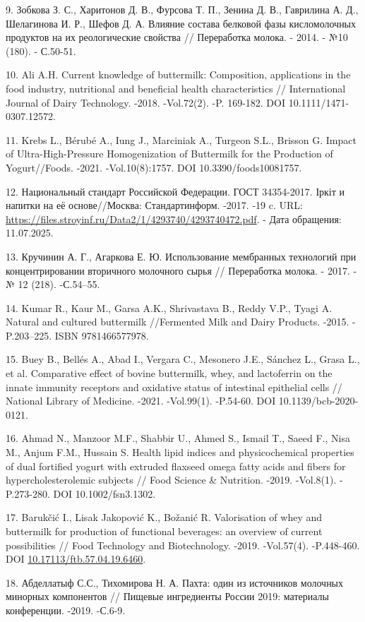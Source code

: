 \begin{refs}
9. Зобкова З. С., Харитонов Д. В., Фурсова Т. П., Зенина Д. В., Гаврилина
А. Д., Шелагинова И. Р., Шефов Д. А. Влияние состава белковой фазы
кисломолочных продуктов на их реологические свойства // Переработка
молока. - 2014. - №10 (180). - С.50-51.

10. Ali A.H. Current knowledge of buttermilk: Composition, applications in
the food industry, nutritional and beneficial health characteristics
// International Journal of Dairy Technology. -2018. -Vol.72(2). -P.
169-182. DOI 10.1111/1471-0307.12572.

11. Krebs L., Bérubé A., Iung J., Marciniak A., Turgeon S.L., Brisson G.
Impact of Ultra-High-Pressure Homogenization of Buttermilk for the
Production of Yogurt//Foods. -2021. -Vol.10(8):1757. DOI
10.3390/foods10081757.

12. Национальный стандарт Российской Федерации. ГОСТ 34354-2017. Іркіт и
напитки на её основе//Москва: Стандартинформ. -2017. -19 c. URL:
\url{https://files.stroyinf.ru/Data2/1/4293740/4293740472.pdf}. - Дата
обращения: 11.07.2025.

13. Кручинин А. Г., Агаркова Е. Ю. Использование мембранных технологий при
концентрировании вторичного молочного сырья // Переработка молока. -
2017. - № 12 (218). -С.54--55.

14. Kumar R., Kaur M., Garsa A.K., Shrivastava B., Reddy V.P., Tyagi A.
Natural and cultured buttermilk //Fermented Milk and Dairy Products.
-2015. -P.203--225. ISBN 9781466577978.

15. Buey B., Bellés A., Abad I., Vergara C., Mesonero J.E., Sánchez L.,
Grasa L., et al. Comparative effect of bovine buttermilk, whey, and
lactoferrin on the innate immunity receptors and oxidative status of
intestinal epithelial cells // National Library of Medicine. -2021.
-Vol.99(1). -P.54-60. DOI 10.1139/bcb-2020-0121.

16. Ahmad N., Manzoor M.F., Shabbir U., Ahmed S., Ismail T., Saeed F.,
Nisa M., Anjum F.M., Hussain S. Health lipid indices and
physicochemical properties of dual fortified yogurt with extruded
flaxseed omega fatty acids and fibers for hypercholesterolemic
subjects // Food Science \& Nutrition. -2019. -Vol.8(1). -P.273-280.
DOI 10.1002/fsn3.1302.

17. Barukčić I., Lisak Jakopović K., Božanić R. Valorisation of whey and
buttermilk for production of functional beverages: an overview of
current possibilities // Food Technology and Biotechnology. -2019.
-Vol.57(4). -P.448-460. DOI
\href{https://doi.org/10.17113/ftb.57.04.19.6460}{10.17113/ftb.57.04.19.6460}.

18. Абделлатыф С.С., Тихомирова Н. А. Пахта: один из источников молочных
минорных компонентов // Пищевые ингредиенты России 2019: материалы
конференции. -2019. -С.6-9.
\end{refs}

